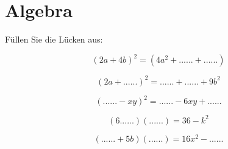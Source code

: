 
\section{Algebra}

Füllen Sie die Lücken aus:

$$(2a + 4b)^2 = (4a^2 + ...... + ......)$$

$$(2a + ......)^2 = ...... + ...... + 9b^2$$

$$(...... - xy)^2 = ...... - 6xy + ......$$

$$(6  ......) (......) = 36 - k^2$$

$$(......  + 5b) (......) = 16x^2 - ......$$
